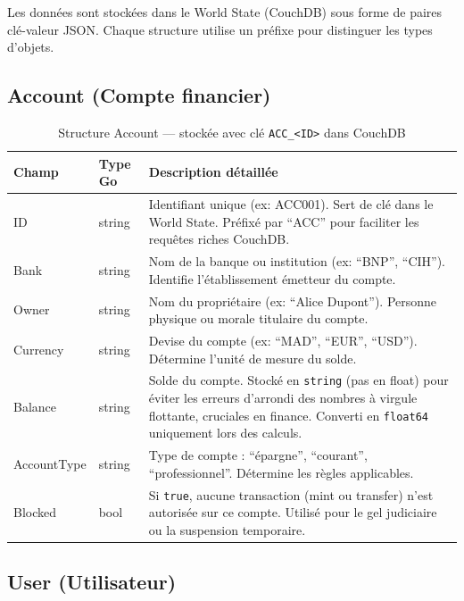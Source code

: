 \documentclass[12pt,a4paper,twoside]{report}
\begin{document}
Les données sont stockées dans le World State (CouchDB) sous forme de paires clé-valeur JSON. Chaque structure utilise un préfixe pour distinguer les types d'objets.

\subsection{Account (Compte financier)}

\begin{table}[H]
\centering
\begin{tabularx}{\textwidth}{llX}
\toprule
\textbf{Champ} & \textbf{Type Go} & \textbf{Description détaillée} \\
\midrule
ID & string & Identifiant unique (ex: ACC001). Sert de clé dans le World State. Préfixé par ``ACC'' pour faciliter les requêtes riches CouchDB. \\
Bank & string & Nom de la banque ou institution (ex: ``BNP'', ``CIH''). Identifie l'établissement émetteur du compte. \\
Owner & string & Nom du propriétaire (ex: ``Alice Dupont''). Personne physique ou morale titulaire du compte. \\
Currency & string & Devise du compte (ex: ``MAD'', ``EUR'', ``USD''). Détermine l'unité de mesure du solde. \\
Balance & string & Solde du compte. Stocké en \texttt{string} (pas en float) pour éviter les erreurs d'arrondi des nombres à virgule flottante, cruciales en finance. Converti en \texttt{float64} uniquement lors des calculs. \\
AccountType & string & Type de compte : ``épargne'', ``courant'', ``professionnel''. Détermine les règles applicables. \\
Blocked & bool & Si \texttt{true}, aucune transaction (mint ou transfer) n'est autorisée sur ce compte. Utilisé pour le gel judiciaire ou la suspension temporaire. \\
\bottomrule
\end{tabularx}
\caption{Structure Account --- stockée avec clé \texttt{ACC\_<ID>} dans CouchDB}
\end{table}

\subsection{User (Utilisateur)}
\end{document}
